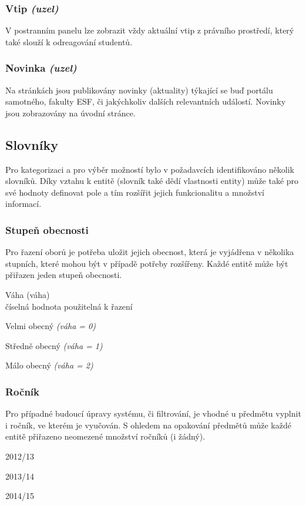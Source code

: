 \subsubsection*{Vtip \emph{(uzel)}}
V postranním panelu lze zobrazit vždy aktuální vtip z právního prostředí, který také slouží k odreagování studentů. \\

\subsubsection*{Novinka \emph{(uzel)}}
Na stránkách jsou publikovány novinky (aktuality) týkající se buď portálu samotného, fakulty ESF, či jakýchkoliv dalších relevantních událostí. Novinky jsou zobrazovány na úvodní stránce. \\

\subsection{Slovníky}

Pro kategorizaci a pro výběr možností bylo v požadavcích identifikováno několik slovníků. Díky vztahu k entitě (slovník také dědí vlastnosti entity) může také pro své hodnoty definovat pole a tím rozšířit jejich funkcionalitu a množství informací.

\subsubsection*{Stupeň obecnosti}
Pro řazení oborů je potřeba uložit jejich obecnost, která je vyjádřena v několika stupních, které mohou být v případě potřeby rozšířeny. Každé entitě může být přiřazen jeden stupeň obecnosti.\\

\begin{list}{-}{Pole}
  \item Váha (váha) \\
    číselná hodnota použitelná k řazení
\end{list}

\begin{list}{-}{Hodnoty}
  \item Velmi obecný \emph{(váha = 0)} 
  \item Středně obecný \emph{(váha = 1)}
  \item Málo obecný \emph{(váha = 2)}
\end{list}

\subsubsection*{Ročník}
Pro případné budoucí úpravy systému, či filtrování, je vhodné u předmětu vyplnit i ročník, ve kterém je vyučován. S ohledem na opakování předmětů může každé entitě přiřazeno neomezené množství ročníků (i žádný). \\

\begin{list}{-}{Hodnoty}
  \item 2012/13
  \item 2013/14
  \item 2014/15
\end{list}
